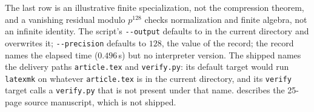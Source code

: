\documentclass[11pt]{article}
\numberwithin{equation}{section}
\theoremstyle{definition}
\theoremstyle{remark}
\begin{document}
The last row is an illustrative finite specialization, not the compression
theorem, and a vanishing residual modulo $p^{128}$ checks normalization and
finite algebra, not an infinite identity. The script's \verb|--output| defaults
to  in the current directory and overwrites it;
\verb|--precision| defaults to $128$, the value of the record; the record
names the elapsed time ($0.496$\,s) but no interpreter version. The shipped
 names the delivery paths
\texttt{article.tex} and \texttt{verify.py}: its default target would run
\texttt{latexmk} on whatever \texttt{article.tex} is in the current directory,
and its \texttt{verify} target calls a \texttt{verify.py} that is not present
under that name.  describes the
25-page source manuscript, which is not shipped.

\end{document}
